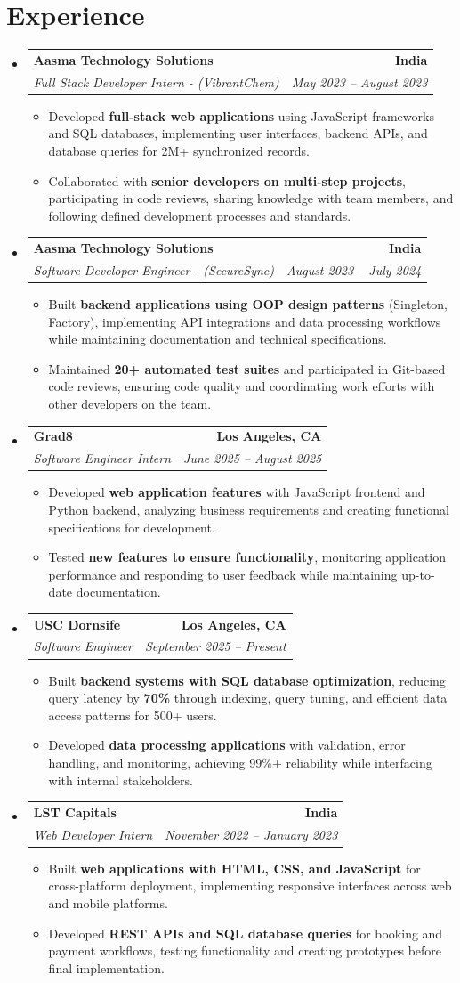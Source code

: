 \documentclass[letterpaper,10pt]{article}
\makeatletter
\newcommand{\resumeItem}[1]{\item\small{{#1 \vspace{-2pt}}}}
\newcommand{\resumeSubheading}[4]{\vspace{-1pt}\item\begin{tabular*}{1.0\textwidth}[t]{l@{\extracolsep{\fill}}r}\textbf{#1} & \textbf{\small #2} \\\textit{\small#3} & \textit{\small #4} \\\end{tabular*}\vspace{-2pt}}
\newcommand{\resumeSubHeadingListStart}{\begin{itemize}[leftmargin=0.0in, label={}]}
\newcommand{\resumeSubHeadingListEnd}{\end{itemize}}
\newcommand{\resumeItemListStart}{\begin{itemize}[leftmargin=0.15in,label=\textbullet,itemsep=2pt,topsep=0pt,parsep=0pt,partopsep=0pt]}
\newcommand{\resumeItemListEnd}{\end{itemize}\vspace{-4pt}}
\makeatother
\begin{document}
\section{Experience}
\resumeSubHeadingListStart
\resumeSubheading{Aasma Technology Solutions}{India}{Full Stack Developer Intern - (VibrantChem)}{May 2023 -- August 2023}
\resumeItemListStart
\resumeItem{Developed \textbf{full-stack web applications} using JavaScript frameworks and SQL databases, implementing user interfaces, backend APIs, and database queries for 2M+ synchronized records.}
\resumeItem{Collaborated with \textbf{senior developers on multi-step projects}, participating in code reviews, sharing knowledge with team members, and following defined development processes and standards.}
\resumeItemListEnd
\resumeSubheading{Aasma Technology Solutions}{India}{Software Developer Engineer - (SecureSync)}{August 2023 -- July 2024}
\resumeItemListStart
\resumeItem{Built \textbf{backend applications using OOP design patterns} (Singleton, Factory), implementing API integrations and data processing workflows while maintaining documentation and technical specifications.}
\resumeItem{Maintained \textbf{20+ automated test suites} and participated in Git-based code reviews, ensuring code quality and coordinating work efforts with other developers on the team.}
\resumeItemListEnd
\resumeSubheading{Grad8}{Los Angeles, CA}{Software Engineer Intern}{June 2025 -- August 2025}
\resumeItemListStart
\resumeItem{Developed \textbf{web application features} with JavaScript frontend and Python backend, analyzing business requirements and creating functional specifications for development.}
\resumeItem{Tested \textbf{new features to ensure functionality}, monitoring application performance and responding to user feedback while maintaining up-to-date documentation.}
\resumeItemListEnd
\resumeSubheading{USC Dornsife}{Los Angeles, CA}{Software Engineer}{September 2025 -- Present}
\resumeItemListStart
\resumeItem{Built \textbf{backend systems with SQL database optimization}, reducing query latency by \textbf{70\%} through indexing, query tuning, and efficient data access patterns for 500+ users.}
\resumeItem{Developed \textbf{data processing applications} with validation, error handling, and monitoring, achieving 99\%+ reliability while interfacing with internal stakeholders.}
\resumeItemListEnd
\resumeSubheading{LST Capitals}{India}{Web Developer Intern}{November 2022 -- January 2023}
\resumeItemListStart
\resumeItem{Built \textbf{web applications with HTML, CSS, and JavaScript} for cross-platform deployment, implementing responsive interfaces across web and mobile platforms.}
\resumeItem{Developed \textbf{REST APIs and SQL database queries} for booking and payment workflows, testing functionality and creating prototypes before final implementation.}
\resumeItemListEnd
\resumeSubHeadingListEnd
\vspace{-14pt}
\end{document}
